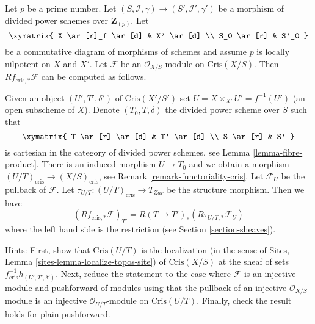 \begin{remark}
\label{remark-compute-direct-image}
Let $p$ be a prime number. Let
$(S, \mathcal{I}, \gamma) \to (S', \mathcal{I}', \gamma')$ be
a morphism of divided power schemes over $\mathbf{Z}_{(p)}$. Let
$$
\xymatrix{
X \ar[r]_f \ar[d] & X' \ar[d] \\
S_0 \ar[r] & S'_0
}
$$
be a commutative diagram of morphisms of schemes and assume $p$ is
locally nilpotent on $X$ and $X'$. Let $\mathcal{F}$ be an
$\mathcal{O}_{X/S}$-module on $\text{Cris}(X/S)$. Then
$Rf_{\text{cris}, *}\mathcal{F}$ can be computed as follows.

\medskip\noindent
Given an object $(U', T', \delta')$ of $\text{Cris}(X'/S')$ set
$U = X \times_{X'} U' = f^{-1}(U')$ (an open subscheme of $X$). Denote
$(T_0, T, \delta)$ the divided power scheme over $S$ such that
$$
\xymatrix{
T \ar[r] \ar[d] & T' \ar[d] \\
S \ar[r] & S'
}
$$
is cartesian in the category of divided power schemes, see
Lemma \ref{lemma-fibre-product}. There is an
induced morphism $U \to T_0$ and we obtain a morphism
$(U/T)_{\text{cris}} \to (X/S)_{\text{cris}}$, see
Remark \ref{remark-functoriality-cris}.
Let $\mathcal{F}_U$ be the pullback of $\mathcal{F}$.
Let $\tau_{U/T} : (U/T)_{\text{cris}} \to T_{Zar}$ be the structure morphism.
Then we have
\begin{equation}
\label{equation-identify-pushforward}
\left(Rf_{\text{cris}, *}\mathcal{F}\right)_{T'} =
R(T \to T')_*\left(R\tau_{U/T, *} \mathcal{F}_U \right)
\end{equation}
where the left hand side is the restriction (see
Section \ref{section-sheaves}).

\medskip\noindent
Hints: First, show that $\text{Cris}(U/T)$ is the localization (in the sense
of Sites, Lemma \ref{sites-lemma-localize-topos-site}) of $\text{Cris}(X/S)$
at the sheaf of sets $f_{\text{cris}}^{-1}h_{(U', T', \delta')}$. Next, reduce
the statement to the case where $\mathcal{F}$ is an injective module
and pushforward of modules using that the pullback of an injective
$\mathcal{O}_{X/S}$-module is an injective $\mathcal{O}_{U/T}$-module on
$\text{Cris}(U/T)$. Finally, check the result holds for plain pushforward.
\end{remark}

